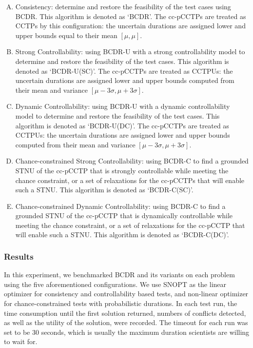 \documentclass[jair,twoside,11pt,theapa]{article}
\begin{document}
\begin{enumerate}[A.]
	\item Consistency: determine and restore the feasibility of the test cases
	using BCDR. This algorithm is denoted as `BCDR'. The cc-pCCTPs are treated as
	CCTPs by this configuration: the uncertain durations are assigned lower and
	upper bounds equal to their mean $[\mu, \mu]$.
	
	\item Strong Controllability: using BCDR-U with a strong controllability model
	to determine and restore the feasibility of the test cases. This algorithm is
	denoted as `BCDR-U(SC)'. The cc-pCCTPs are treated as CCTPUs: the uncertain
	durations are assigned lower and upper bounds computed from their mean and
	variance $[\mu-3\sigma, \mu+3\sigma]$.
	
	\item Dynamic Controllability: using BCDR-U with a dynamic controllability
	model to determine and restore the feasibility of the test cases. This
	algorithm is denoted as `BCDR-U(DC)'. The cc-pCCTPs are treated as CCTPUs: the
	uncertain durations are assigned lower and upper bounds computed from their
	mean and variance $[\mu-3\sigma, \mu+3\sigma]$.
	
	\item Chance-constrained Strong Controllability: using BCDR-C to find a
	grounded STNU of the cc-pCCTP that is strongly controllable while meeting the
	chance constraint, or a set of relaxations for the cc-pCCTPs that will enable
	such a STNU. This algorithm is denoted as `BCDR-C(SC)'.
	
	\item Chance-constrained Dynamic Controllability: using BCDR-C to find a
	grounded STNU of the cc-pCCTP that is dynamically controllable while meeting the
	chance constraint, or a set of relaxations for the cc-pCCTP that will enable
	such a STNU. This algorithm is denoted as `BCDR-C(DC)'.
\end{enumerate}





\subsubsection{Results}


In this experiment, we benchmarked BCDR and its variants on each problem using
the five aforementioned configurations. We use SNOPT as the linear optimizer for
consistency and controllability based tests, and non-linear optimizer for
chance-constrained tests with probabilistic durations. In each test run, the
time consumption until the first solution returned, numbers of conflicts
detected, as well as the utility of the solution, were recorded. The timeout for
each run was set to be 30 seconds, which is usually the maximum duration
scientists are willing to wait for.
\end{document}
